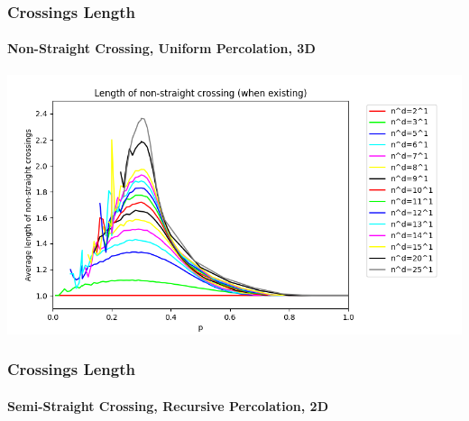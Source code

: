 \documentclass{beamer}
\begin{document}
	\begin{frame}
		\frametitle{Crossings Length}
		\framesubtitle{Non-Straight Crossing, Uniform Percolation, 3D}
		\includegraphics[scale=0.5]{imgs/crossing_length_3D_bis.png}
	\end{frame}
	\begin{frame}
		\frametitle{Crossings Length}
		\framesubtitle{Semi-Straight Crossing, Recursive Percolation, 2D}
	\end{frame}
\end{document}
